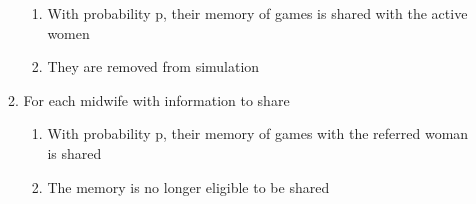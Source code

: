 \begin{enumerate}
\begin{enumerate}
\begin{enumerate}
		\item With probability p, their memory of games is shared with the active women
		\item They are removed from simulation
	\end{enumerate}
	\item For each midwife with information to share
	\begin{enumerate}
		\item With probability p, their memory of games with the referred woman is shared
		\item The memory is no longer eligible to be shared
	\end{enumerate}
\end{enumerate}
\end{enumerate}